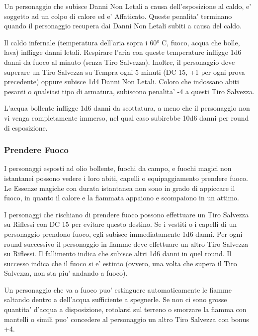 \documentclass[a4paper,11pt,twoside,openany]{book}
\begin{document}
{Un personaggio che subisce Danni Non Letali a causa dell'esposizione al caldo, e' soggetto ad un colpo di calore ed e' Affaticato. Queste penalita' terminano quando il personaggio recupera dai Danni Non Letali subiti a causa del caldo.

Il caldo infernale (temperatura dell'aria sopra i 60° C, fuoco, acqua che bolle, lava) infligge danni letali. Respirare l'aria con queste temperature infligge 1d6 danni da fuoco al minuto (senza Tiro Salvezza). 
Inoltre, il personaggio deve superare un Tiro Salvezza su Tempra ogni 5 minuti (DC 15, +1 per ogni prova precedente) oppure subisce 1d4 Danni Non Letali. Coloro che indossano abiti pesanti o qualsiasi tipo di armatura, subiscono penalita' -4 a questi Tiro Salvezza.

L'acqua bollente infligge 1d6 danni da scottatura, a meno che il personaggio non vi venga completamente immerso, nel qual caso subirebbe 10d6 danni per round di esposizione.

\subsubsection{Prendere Fuoco}

\label{prendere-fuoco}

I personaggi esposti ad olio bollente, fuochi da campo, e fuochi magici non istantanei possono vedere i loro abiti, capelli o equipaggiamento prendere fuoco. Le Essenze magiche con durata istantanea non sono in grado di appiccare il fuoco, in quanto il calore e la fiammata appaiono e scompaiono in un attimo.

I personaggi che rischiano di prendere fuoco possono effettuare un Tiro Salvezza su Riflessi con DC 15 per evitare questo destino. Se i vestiti o i capelli di un personaggio prendono fuoco, egli subisce immediatamente 1d6 danni. Per ogni round successivo il personaggio in fiamme deve effettuare un altro Tiro Salvezza su Riflessi. Il fallimento indica che subisce altri 1d6 danni in quel round. Il successo indica che il fuoco si e' estinto (ovvero, una volta che supera il Tiro Salvezza, non sta piu' andando a fuoco).

Un personaggio che va a fuoco puo' estinguere automaticamente le fiamme saltando dentro a dell'acqua sufficiente a spegnerle. Se non ci sono grosse quantita' d'acqua a disposizione, rotolarsi sul terreno o smorzare la fiamma con mantelli o simili puo' concedere al personaggio un altro Tiro Salvezza con bonus +4.

}
\end{document}
